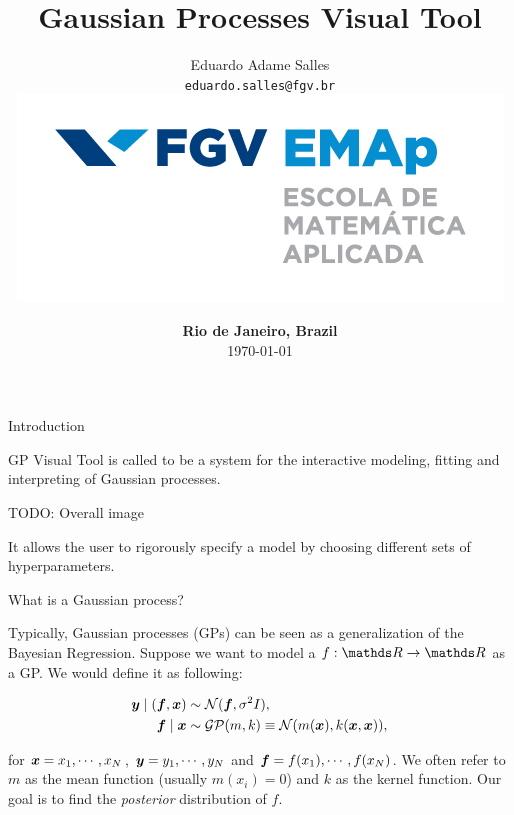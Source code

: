 \documentclass[xcolor=dvipsnames,t,aspectratio=169]{beamer} %
\title{Gaussian Processes Visual Tool} %
\author{Eduardo Adame Salles\\
{\small\texttt{eduardo.salles@fgv.br}}\\
\vspace{0.4cm} \hspace{0.2cm} \includegraphics[scale = 0.25]{emap_logo}}
\date{{\color{fgv_dark_blue}  \textbf{Rio de Janeiro, Brazil}\\ \today}}
\newcommand{\highlight}[1]{{\color{fgv_light_blue} #1}}
\begin{document}
\frame{\titlepage}


\begin{frame}[c]{Introduction}

    \begin{block}{}
    GP Visual Tool is called to be a system for the interactive modeling, fitting and interpreting of \highlight{Gaussian processes}.
    \end{block}\vspace*{1cm}

    TODO: Overall image
    
    It allows the user to \highlight{rigorously} specify \highlight{a model} by choosing different sets of \highlight{hyperparameters}. 

\end{frame}

\begin{frame}[c]{What is a \highlight{Gaussian process}?}

Typically, \highlight{Gaussian processes} (GPs) can be seen as a generalization of the \highlight{Bayesian Regression}. Suppose we want to model a $f: \bR \to \bR$ as a GP. We would \highlight{define} it as following:

\begin{align*}
        \boldsymbol{y} \mid (\boldsymbol{f}, \boldsymbol{x}) &\sim \mathcal{N}(\boldsymbol{f}, \sigma^2 I),\\
        \boldsymbol{f} \mid \boldsymbol{x} &\sim \mathcal{GP}(m, k) \equiv \mathcal{N}(m(\boldsymbol{x}), k(\boldsymbol{x}, \boldsymbol{x})), 
    \end{align*}

    for $\boldsymbol{x} = x_1, \cdots, x_N$, $\boldsymbol{y} =  y_1, \cdots, y_N$ and $\boldsymbol{f} =  f(x_1), \cdots, f(x_N)$. We often refer to $m$ as the \highlight{mean} function (usually $m(x_i) = 0$) and $k$ as the \highlight{kernel} function. Our goal is to find the \highlight{\textit{posterior} distribution} of $f$.

\end{frame}
\end{document}
